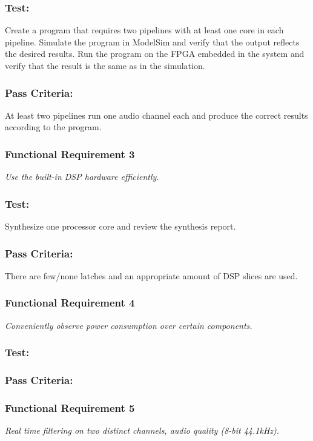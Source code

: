 \subsubsection*{Test:}
Create a program that requires two pipelines with at least one core in each pipeline. 
Simulate the program in ModelSim and verify that the output reflects the desired results.
Run the program on the FPGA embedded in the system and verify that the result is the same as in the simulation.
\subsubsection*{Pass Criteria:}
At least two pipelines run one audio channel each and produce the correct results according to the program.

\subsubsection*{Functional Requirement 3}
\textit{Use the built-in DSP hardware efficiently.}
\subsubsection*{Test:}
Synthesize one processor core and review the synthesis report. 
\subsubsection*{Pass Criteria:}
There are few/none latches and an appropriate amount of DSP slices are used.


\subsubsection*{Functional Requirement 4}
\textit{Conveniently observe power consumption over certain components.}
\subsubsection*{Test:}
\subsubsection*{Pass Criteria:}


\subsubsection*{Functional Requirement 5}
\textit{Real time filtering on two distinct channels, audio quality (8-bit 44.1kHz).}
